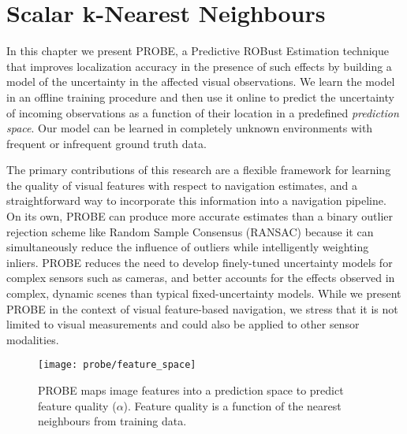 \section{Scalar k-Nearest Neighbours}

In this chapter we present PROBE, a Predictive ROBust Estimation technique that improves localization accuracy in the presence of such effects by building a model of the uncertainty in the affected visual observations. 
We learn the model in an offline training procedure and then use it online to predict the uncertainty of incoming observations as a function of their location in a predefined \emph{prediction space}.
Our model can be learned in completely unknown environments with frequent or infrequent ground truth data. 

The primary contributions of this research are a flexible framework for learning the quality of visual features with respect to navigation estimates, and a straightforward way to incorporate this information into a navigation pipeline. On its own, PROBE can produce more accurate estimates than a binary outlier rejection scheme like Random Sample Consensus (RANSAC) \cite{Fischler:1981cv} because it can simultaneously reduce the influence of outliers while intelligently weighting inliers. PROBE reduces the need to develop finely-tuned uncertainty models for complex sensors such as cameras, and better accounts for the effects observed in complex, dynamic scenes than typical fixed-uncertainty models. While we present PROBE in the context of visual feature-based navigation, we stress that it is not limited to visual measurements and could also be applied to other sensor modalities.

\begin{figure}
    \centering
    \texttt{[image: probe/feature\_space]}
    \caption{PROBE maps image features into a prediction space to predict feature quality ($\alpha$). Feature quality is a function of the nearest neighbours from training data.}
    \label{fig:probe_feature_space}
\end{figure}

